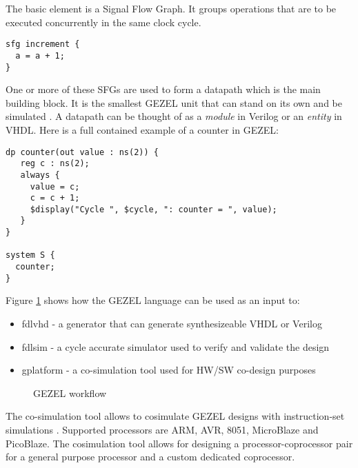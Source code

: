 The basic element is a Signal Flow Graph. It groups operations that
are to be executed concurrently in the same clock cycle.
\begin{lstlisting}[language=GEZEL]
sfg increment {
  a = a + 1;
}
\end{lstlisting}
One or more of these SFGs are used to form a datapath which is the
main building block. It is the smallest GEZEL unit that can stand on
its own and be simulated \cite{gezel}. A datapath can be thought of as
a \emph{module} in Verilog or an \emph{entity} in VHDL. Here is a
full contained example of a counter in GEZEL:
\begin{lstlisting}[language=GEZEL]
dp counter(out value : ns(2)) {
   reg c : ns(2);
   always {
     value = c;
     c = c + 1;
     $display("Cycle ", $cycle, ": counter = ", value);
   }
}

system S {
  counter;
}
\end{lstlisting}

Figure \ref{fig:gezel_workflow} shows how the GEZEL language
can be used as an input to:
\begin{itemize}
\item fdlvhd - a generator that can generate synthesizeable VHDL or
  Verilog
\item fdlsim - a cycle accurate simulator used to verify and validate
  the design
\item gplatform - a co-simulation tool used for HW/SW co-design purposes
\end{itemize}

\begin{figure}[hb!]
  \centering
  \caption{GEZEL workflow \cite{gezel}}
  \label{fig:gezel_workflow}
\end{figure}

The co-simulation tool allows to cosimulate GEZEL designs with
instruction-set simulations \cite{gezel}. Supported processors are
ARM, AVR, 8051, MicroBlaze and PicoBlaze. The cosimulation tool allows
for designing a processor-coprocessor pair for a general purpose
processor and a custom dedicated coprocessor.

